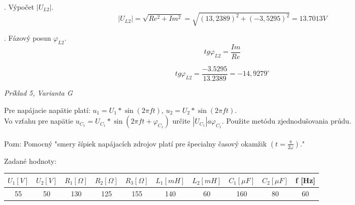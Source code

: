 \documentclass[a4paper,12pt]{article}
\begin{document}
. Výpočet $\vert U_{L2}\vert$.
\begin{equation}
\vert U_{L2}\vert = \sqrt{Re^2 + Im^2} = \sqrt{(13,2389)^2 + (-3,5295)^2} = 13.7013V
\end{equation}

. Fázový posun $\varphi _{L2}$.
\begin{equation}
tg \varphi _{L2} = \frac{Im}{Re}
\end{equation}

\begin{equation}
tg \varphi _{L2} = \frac{-3.5295}{13.2389} = -14,9279^{\circ}
\end{equation}


\newpage
\begin{center}
\emph{Príklad 5, Varianta G}
\end{center}

\bigskip
Pre napájacie napätie platí: $u_1 = U_1 * \sin (2\pi ft)$, $u_2 = U_2 * \sin (2\pi ft)$. \\
Vo vzťahu pre napätie  $ u_{C_1} = U_{C_1} * \sin (2\pi ft + \varphi_{C_1})$ určite $|U_{C_1}| a  \varphi_{C_1}$. Použite metódu zjednodušovania prúdu. \\
\\
Pozn: Pomocný "smery šípiek napájacích zdrojov platí pre špecialny časový okamžik $(t = \frac{\pi}{2\omega})$."
\bigskip

Zadané hodnoty:
\begin{center}
\begin{tabular} {|  c | c | c |  c | c | c | c | c | c | c | }
\hline
$U_1 [V]$ & $U_2 [V]$ &  $R_1 [\Omega]$  & $R_2 [\Omega]$  &$R_3 [\Omega]$  & $L_1 [mH]$ & $L_2 [mH]$ & $C_1[\mu F]$ & $C_2[\mu F]$  & f [Hz] \\ \hline
55 & 50 & 130 & 125 & 155 & 140 & 60 & 160 & 80 & 60\\ \hline
\end{tabular}
\end{center}
\end{document}
